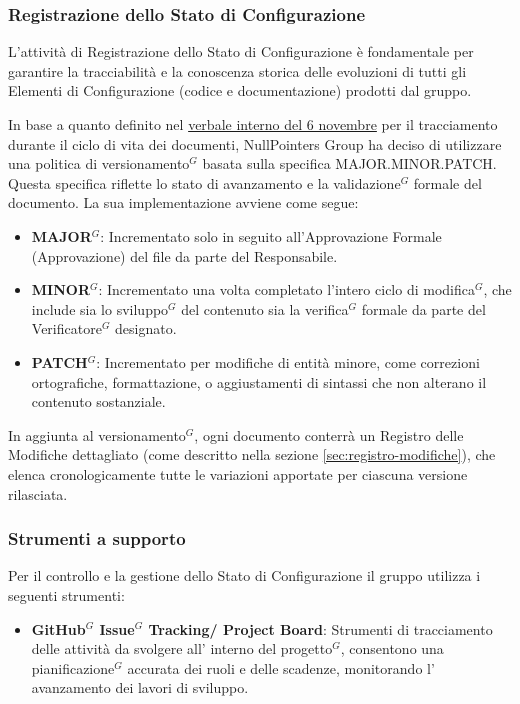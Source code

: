\subsubsection{Registrazione dello Stato di Configurazione}
L'attività di Registrazione dello Stato di Configurazione è fondamentale per garantire la tracciabilità e la conoscenza storica delle evoluzioni di tutti gli Elementi di Configurazione (codice e documentazione) prodotti dal gruppo.

In base a quanto definito nel \href{https://nullpointersgroup.github.io/Documentazione/output/RTB/Verbali%20Interni/2025-11-06_verbale_interno.pdf}{verbale interno del 6 novembre} per il tracciamento durante il ciclo di vita dei documenti, NullPointers Group ha deciso di utilizzare una politica di versionamento$^G$ basata sulla specifica MAJOR.MINOR.PATCH. Questa specifica riflette lo stato di avanzamento e la validazione$^G$ formale del documento. La sua implementazione avviene come segue:
\begin{itemize}[itemsep=3pt, parsep=1pt, label=$\scriptstyle\bullet$]
    \item \textbf{MAJOR$^G$}: Incrementato solo in seguito all'Approvazione Formale (Approvazione) del file da parte del Responsabile.
    \item \textbf{MINOR$^G$}: Incrementato una volta completato l'intero ciclo di modifica$^G$, che include sia lo sviluppo$^G$ del contenuto sia la verifica$^G$ formale da parte del Verificatore$^G$ designato.
    \item \textbf{PATCH$^G$}: Incrementato per modifiche di entità minore, come correzioni ortografiche, formattazione, o aggiustamenti di sintassi che non alterano il contenuto sostanziale.
\end{itemize}
In aggiunta al versionamento$^G$, ogni documento conterrà un Registro delle Modifiche dettagliato (come descritto nella sezione \ref{sec:registro-modifiche}), che elenca cronologicamente tutte le variazioni apportate per ciascuna versione rilasciata.

\subsubsection{Strumenti a supporto}
    Per il controllo e la gestione dello Stato di Configurazione il gruppo utilizza i seguenti strumenti:
	\begin{itemize}[itemsep=3pt, parsep=1pt, label=$\scriptstyle\bullet$]
	    \item \textbf{GitHub$^G$ Issue$^G$ Tracking/ Project Board}: Strumenti di tracciamento delle attività da svolgere all' interno del progetto$^G$, consentono una pianificazione$^G$ accurata
        dei ruoli e delle scadenze, monitorando l' avanzamento dei lavori di sviluppo.   
	\end{itemize}

